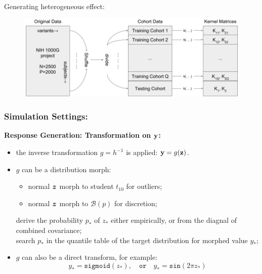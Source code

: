 \documentclass{beamer}
\begin{document}
\begin{frame}
  Generating heterogeneous effect:
  \begin{figure}
    \centering
    \includegraphics[width=\linewidth]{kma_sim_1kg.png}
  \end{figure}
\end{frame}
\begin{frame}
  \frametitle{Simulation Settings:} %
  \textbf{Response Generation: Transformation on $\mathbf{y}$:}
  \begin{itemize}
  \item the inverse transformation $g=h^{-1}$ is applied:
    $\mathbf{y}=g(\mathbf{z})$.
  \item $g$ can be a distribution morph:
    \begin{itemize}
    \item normal $\boldsymbol{z}$ morph to student $t_{10}$ for outliers;
    \item normal $\boldsymbol{z}$ morph to $\mathcal{B}(p)$ for discretion;
    \end{itemize}
    derive the probability $p_*$ of $z_*$ either empirically, or from
    the diagnal of combined covariance; \\
    search $p_*$ in the quantile table of the target distribution for
    morphed value $y_*$;
  \item $g$ can also be a direct transform, for example:
    $$ y_* = \mathtt{sigmoid}(z_*), \quad \mathtt{or} \quad y_* = \mathtt{sin}(2\pi z_*) $$
  \end{itemize}
\end{frame}
\end{document}
